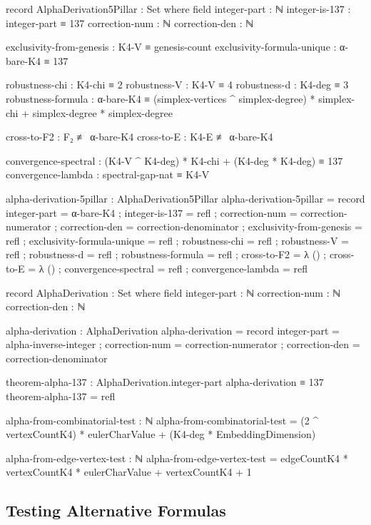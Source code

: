 \documentclass[11pt,a4paper]{book}
\begin{document}
\begin{code}
record AlphaDerivation5Pillar : Set where
  field
    integer-part     : ℕ
    integer-is-137   : integer-part ≡ 137
    correction-num   : ℕ
    correction-den   : ℕ
    
    exclusivity-from-genesis : K4-V ≡ genesis-count
    exclusivity-formula-unique : α-bare-K4 ≡ 137
    
    robustness-chi : K4-chi ≡ 2
    robustness-V : K4-V ≡ 4
    robustness-d : K4-deg ≡ 3
    robustness-formula : α-bare-K4 ≡ (simplex-vertices ^ simplex-degree) * simplex-chi + simplex-degree * simplex-degree
    
    cross-to-F2 : F₂ ≢ α-bare-K4
    cross-to-E : K4-E ≢ α-bare-K4
    
    convergence-spectral : (K4-V ^ K4-deg) * K4-chi + (K4-deg * K4-deg) ≡ 137
    convergence-lambda : spectral-gap-nat ≡ K4-V

alpha-derivation-5pillar : AlphaDerivation5Pillar
alpha-derivation-5pillar = record
  { integer-part   = α-bare-K4
  ; integer-is-137 = refl
  ; correction-num = correction-numerator
  ; correction-den = correction-denominator
  ; exclusivity-from-genesis = refl
  ; exclusivity-formula-unique = refl
  ; robustness-chi = refl
  ; robustness-V = refl
  ; robustness-d = refl
  ; robustness-formula = refl
  ; cross-to-F2 = λ ()
  ; cross-to-E = λ ()
  ; convergence-spectral = refl
  ; convergence-lambda = refl
  }

record AlphaDerivation : Set where
  field
    integer-part     : ℕ
    correction-num   : ℕ
    correction-den   : ℕ

alpha-derivation : AlphaDerivation
alpha-derivation = record
  { integer-part   = alpha-inverse-integer
  ; correction-num = correction-numerator
  ; correction-den = correction-denominator
  }

theorem-alpha-137 : AlphaDerivation.integer-part alpha-derivation ≡ 137
theorem-alpha-137 = refl

alpha-from-combinatorial-test : ℕ
alpha-from-combinatorial-test = (2 ^ vertexCountK4) * eulerCharValue + (K4-deg * EmbeddingDimension)

alpha-from-edge-vertex-test : ℕ
alpha-from-edge-vertex-test = edgeCountK4 * vertexCountK4 * eulerCharValue + vertexCountK4 + 1
\end{code}

\subsection{Testing Alternative Formulas}
\label{sec:alpha-exhaustion}
\end{document}
